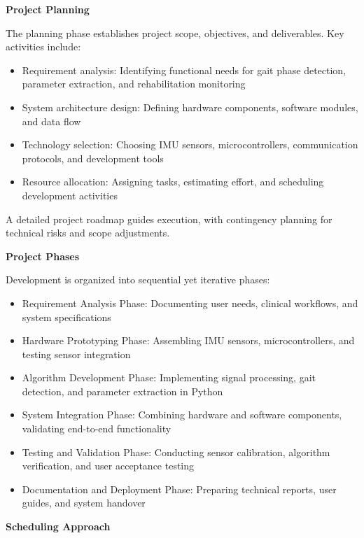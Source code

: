 \documentclass[12pt,a4paper]{report}
\begin{document}
\textbf{Project Planning}

The planning phase establishes project scope, objectives, and deliverables. Key activities include:
\begin{itemize}
\item Requirement analysis: Identifying functional needs for gait phase detection, parameter extraction, and rehabilitation monitoring

\item System architecture design: Defining hardware components, software modules, and data flow

\item Technology selection: Choosing IMU sensors, microcontrollers, communication protocols, and development tools

\item Resource allocation: Assigning tasks, estimating effort, and scheduling development activities
\end{itemize}
A detailed project roadmap guides execution, with contingency planning for technical risks and scope adjustments.

\textbf{Project Phases}

Development is organized into sequential yet iterative phases:
\begin{itemize}
\item Requirement Analysis Phase: Documenting user needs, clinical workflows, and system specifications

\item Hardware Prototyping Phase: Assembling IMU sensors, microcontrollers, and testing sensor integration

\item Algorithm Development Phase: Implementing signal processing, gait detection, and parameter extraction in Python

\item System Integration Phase: Combining hardware and software components, validating end-to-end functionality

\item Testing and Validation Phase: Conducting sensor calibration, algorithm verification, and user acceptance testing

\item Documentation and Deployment Phase: Preparing technical reports, user guides, and system handover
\end{itemize}
\textbf{Scheduling Approach}
\end{document}

